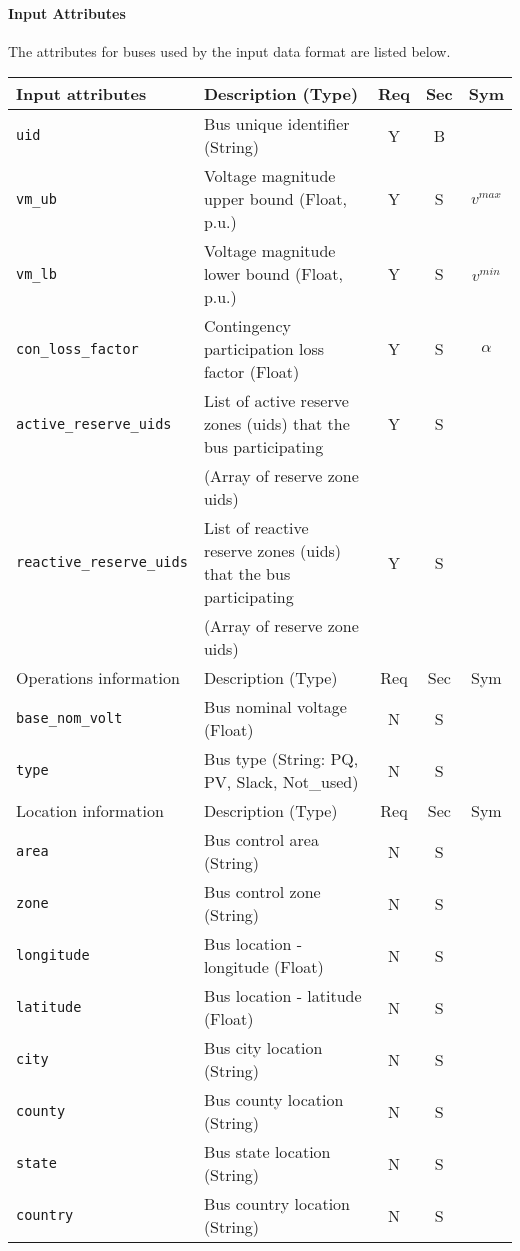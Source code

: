 \documentclass{article}
\begin{document}
\paragraph{Input Attributes} The attributes for buses used by the input data format are listed below.

\begin{center}
\small
\begin{tabular}{ l | l | c | c | c |}
Input attributes & Description (Type) & Req & Sec & Sym\\
\hline
  {\tt uid} & Bus unique identifier (String)& Y & B &  \\
  {\tt vm\_ub} & Voltage magnitude upper bound (Float, p.u.)& Y & S & $v^{max}$\\
  {\tt vm\_lb} & Voltage magnitude lower bound (Float, p.u.)& Y & S & $v^{min}$\\
  {\tt con\_loss\_factor} & Contingency participation loss factor (Float) & Y & S & $\alpha$\\
  {\tt active\_reserve\_uids} & List of active reserve zones (uids) that the bus participating & Y & S & \\
                     &  (Array of reserve zone uids) &  & & \\
  {\tt reactive\_reserve\_uids} & List of reactive reserve zones (uids) that the bus participating & Y & S & \\
                     &  (Array of reserve zone uids) &  & & \\
  \hline
  Operations information & Description (Type) & Req & Sec & Sym\\
  \hline
  {\tt base\_nom\_volt} & Bus nominal voltage (Float) & N & S & \\
  {\tt type} & Bus type (String: PQ, PV, Slack, Not\_used) & N & S &\\
  \hline
  Location information & Description (Type) & Req & Sec & Sym\\
  \hline
  {\tt area} &  Bus control area (String)& N & S & \\
  {\tt zone} &  Bus control zone (String)& N & S & \\
  {\tt longitude} & Bus location - longitude (Float) & N & S & \\
  {\tt latitude} & Bus location - latitude (Float) & N & S & \\
  {\tt city}     & Bus city location (String) & N & S & \\
  {\tt county}     & Bus county location (String) & N & S & \\
  {\tt state}    & Bus state location (String) & N & S & \\
  {\tt country}  & Bus country location (String) & N & S & \\
  \hline
\end{tabular}
\end{center}
\end{document}
